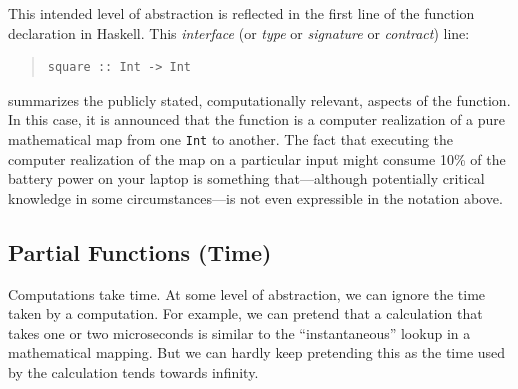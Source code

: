 \documentclass{article}
\theoremstyle{remark}
\begin{document}
This intended level of abstraction is reflected in the first
line of the function declaration in Haskell. This \emph{interface} (or \emph{type}
or \emph{signature} or \emph{contract}) line:
\begin{quote}
\begin{verbatim}
square :: Int -> Int
\end{verbatim}
\end{quote}
summarizes the publicly stated, computationally relevant, aspects of the
function. In this case, it is announced that the function is a computer
realization of a pure mathematical map from one \verb|Int| to another. The
fact that executing the computer realization of the map on a particular input
might consume 10\% of the battery power on your laptop is something
that---although potentially critical knowledge in some circumstances---is not
even expressible in the notation above. 

\subsection*{Partial Functions (Time)}

Computations take time. At some level of abstraction, we can ignore the time
taken by a computation. For example, we can pretend that a calculation that
takes one or two microseconds is similar to the ``instantaneous'' lookup in a
mathematical mapping. But we can hardly keep pretending this as the time used
by the calculation tends towards infinity.
\end{document}
